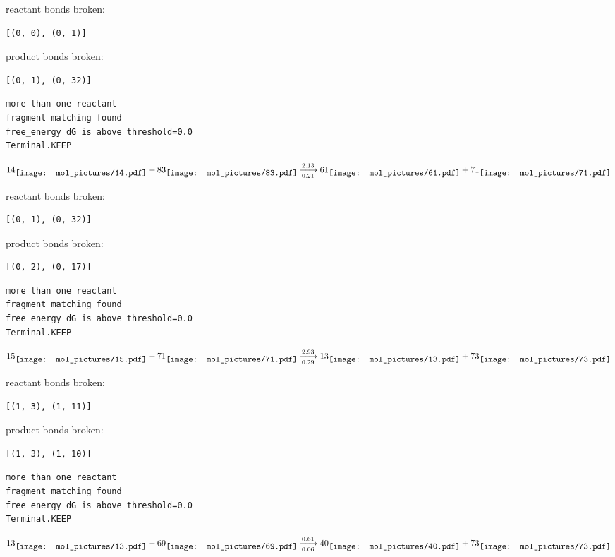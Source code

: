 \documentclass{article}
\begin{document}
reactant bonds broken:\begin{verbatim}
[(0, 0), (0, 1)]
\end{verbatim}
product bonds broken:\begin{verbatim}
[(0, 1), (0, 32)]
\end{verbatim}




\vspace{1cm}
\begin{verbatim}
more than one reactant
fragment matching found
free_energy dG is above threshold=0.0
Terminal.KEEP
\end{verbatim}
$$
14
\raisebox{-.5\height}{\texttt{[image: mol\_pictures/14.pdf]}}
+
83
\raisebox{-.5\height}{\texttt{[image: mol\_pictures/83.pdf]}}
\xrightarrow[0.21]{2.13}
61
\raisebox{-.5\height}{\texttt{[image: mol\_pictures/61.pdf]}}
+
71
\raisebox{-.5\height}{\texttt{[image: mol\_pictures/71.pdf]}}
$$


reactant bonds broken:\begin{verbatim}
[(0, 1), (0, 32)]
\end{verbatim}
product bonds broken:\begin{verbatim}
[(0, 2), (0, 17)]
\end{verbatim}




\vspace{1cm}
\begin{verbatim}
more than one reactant
fragment matching found
free_energy dG is above threshold=0.0
Terminal.KEEP
\end{verbatim}
$$
15
\raisebox{-.5\height}{\texttt{[image: mol\_pictures/15.pdf]}}
+
71
\raisebox{-.5\height}{\texttt{[image: mol\_pictures/71.pdf]}}
\xrightarrow[0.29]{2.93}
13
\raisebox{-.5\height}{\texttt{[image: mol\_pictures/13.pdf]}}
+
73
\raisebox{-.5\height}{\texttt{[image: mol\_pictures/73.pdf]}}
$$


reactant bonds broken:\begin{verbatim}
[(1, 3), (1, 11)]
\end{verbatim}
product bonds broken:\begin{verbatim}
[(1, 3), (1, 10)]
\end{verbatim}




\vspace{1cm}
\begin{verbatim}
more than one reactant
fragment matching found
free_energy dG is above threshold=0.0
Terminal.KEEP
\end{verbatim}
$$
13
\raisebox{-.5\height}{\texttt{[image: mol\_pictures/13.pdf]}}
+
69
\raisebox{-.5\height}{\texttt{[image: mol\_pictures/69.pdf]}}
\xrightarrow[0.06]{0.61}
40
\raisebox{-.5\height}{\texttt{[image: mol\_pictures/40.pdf]}}
+
73
\raisebox{-.5\height}{\texttt{[image: mol\_pictures/73.pdf]}}
$$
\end{document}
